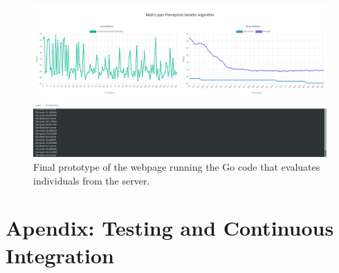 \begin{figure}[h!]
		\centering
    	\includegraphics[width=\linewidth]{assets/images/web-milestone2.png}
    	\caption{Final prototype of the webpage running the Go code that evaluates individuals from the server.}
    	\label{image:web-milestone1}
\end{figure}











\section{Apendix: Testing and Continuous Integration}